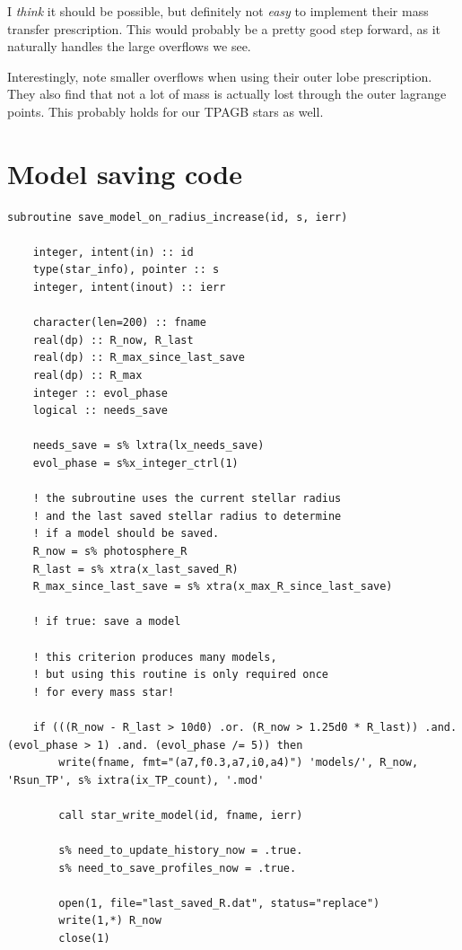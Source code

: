 \documentclass[a4paper,10pt]{article}
\begin{document}
I \emph{think} it should be possible, but definitely not \emph{easy} to implement their mass transfer prescription. This would probably be a pretty good step forward, as it naturally handles the large overflows we see.

Interestingly, \citet{marchant2021} note smaller overflows when using their outer lobe prescription. They also find that not a lot of mass is actually lost through the outer lagrange points. This probably holds for our TPAGB stars as well.

\nextpage

\appendix
\section{Model saving code}\label{app:model}
\begin{verbatim}
subroutine save_model_on_radius_increase(id, s, ierr)

    integer, intent(in) :: id
    type(star_info), pointer :: s
    integer, intent(inout) :: ierr

    character(len=200) :: fname
    real(dp) :: R_now, R_last
    real(dp) :: R_max_since_last_save
    real(dp) :: R_max
    integer :: evol_phase
    logical :: needs_save

    needs_save = s% lxtra(lx_needs_save)
    evol_phase = s%x_integer_ctrl(1)

    ! the subroutine uses the current stellar radius 
    ! and the last saved stellar radius to determine
    ! if a model should be saved.
    R_now = s% photosphere_R
    R_last = s% xtra(x_last_saved_R)
    R_max_since_last_save = s% xtra(x_max_R_since_last_save)

    ! if true: save a model

    ! this criterion produces many models, 
    ! but using this routine is only required once
    ! for every mass star!
    
    if (((R_now - R_last > 10d0) .or. (R_now > 1.25d0 * R_last)) .and. (evol_phase > 1) .and. (evol_phase /= 5)) then
        write(fname, fmt="(a7,f0.3,a7,i0,a4)") 'models/', R_now, 'Rsun_TP', s% ixtra(ix_TP_count), '.mod'

        call star_write_model(id, fname, ierr)

        s% need_to_update_history_now = .true.
        s% need_to_save_profiles_now = .true.

        open(1, file="last_saved_R.dat", status="replace")
        write(1,*) R_now
        close(1)


\end{verbatim}
\end{document}
